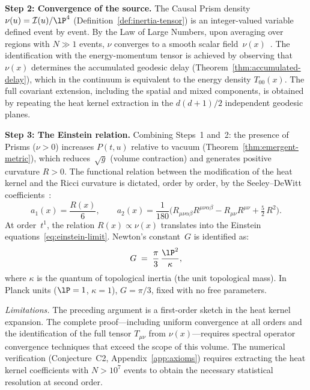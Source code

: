 \medskip
\noindent\textbf{Step 2: Convergence of the source.}
The Causal Prism density $\nu(u) = \mathcal{I}(u)/\lP^4$
(Definition~\ref{def:inertia-tensor}) is an integer-valued variable
defined event by event. By the Law of Large Numbers, upon averaging
over regions with $N \gg 1$ events, $\nu$ converges to a smooth
scalar field~$\nu(x)$~\cite{bombelli1987}. The identification with
the energy-momentum tensor is achieved by observing that $\nu(x)$
determines the accumulated geodesic delay
(Theorem~\ref{thm:accumulated-delay}), which in the continuum is
equivalent to the energy density $T_{00}(x)$. The full covariant
extension, including the spatial and mixed components, is obtained by
repeating the heat kernel extraction in the $d(d+1)/2$ independent
geodesic planes.

\medskip
\noindent\textbf{Step 3: The Einstein relation.}
Combining Steps~1 and~2: the presence of Prisms ($\nu > 0$) increases
$P(t,u)$ relative to vacuum
(Theorem~\ref{thm:emergent-metric}), which reduces~$\sqrt{g}$
(volume contraction) and generates positive curvature $R > 0$. The
functional relation between the modification of the heat kernel and
the Ricci curvature is dictated, order by order, by the
Seeley--DeWitt
coefficients~\cite{minakshisundaram1949,gilkey1975}:
\[
  a_1(x) = \frac{R(x)}{6},
  \qquad
  a_2(x) = \frac{1}{180}\bigl(
    R_{\mu\nu\alpha\beta}R^{\mu\nu\alpha\beta}
    - R_{\mu\nu}R^{\mu\nu}
    + \tfrac{5}{2}\,R^2
  \bigr).
\]
At order~$t^1$, the relation $R(x) \propto \nu(x)$ translates into
the Einstein equations~\eqref{eq:einstein-limit}. Newton's
constant~$G$ is identified as:
\begin{equation}
  G \;=\; \frac{\pi}{3}\,\frac{\lP^2}{\kappa},
  \label{eq:newton-identification}
\end{equation}
where $\kappa$ is the quantum of topological inertia (the unit
topological mass). In Planck units ($\lP = 1$, $\kappa = 1$),
$G = \pi/3$, fixed with no free parameters.

\medskip
\noindent\textit{Limitations.}
The preceding argument is a first-order sketch in the heat kernel
expansion. The complete proof---including uniform convergence at all
orders and the identification of the full tensor $T_{\mu\nu}$ from
$\nu(x)$---requires spectral operator convergence techniques that
exceed the scope of this volume. The numerical verification
(Conjecture~C2, Appendix~\ref{app:axioms}) requires extracting the
heat kernel coefficients with $N > 10^7$ events to obtain the
necessary statistical resolution at second order.

